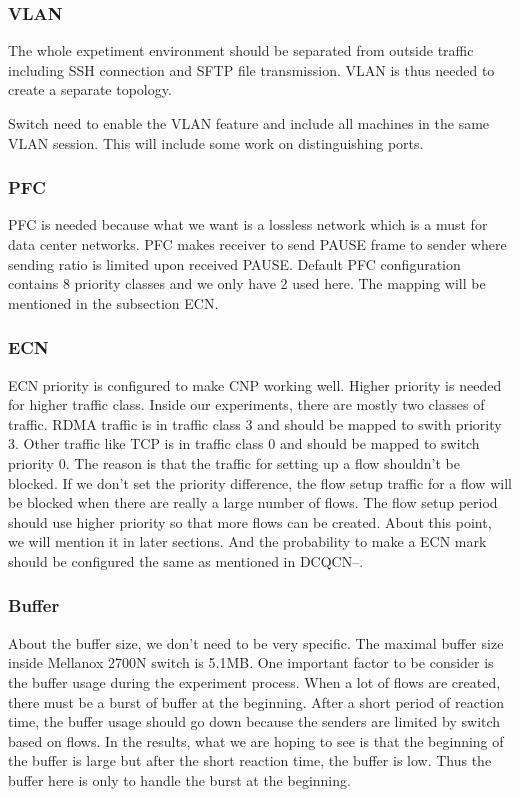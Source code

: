 \documentclass[12pt,a4paper]{article}
\begin{document}
\subsubsection{VLAN}
The whole expetiment environment should be separated from outside traffic including SSH connection and SFTP file transmission.
VLAN is thus needed to create a separate topology.

Switch need to enable the VLAN feature and include all machines in the same VLAN session.
This will include some work on distinguishing ports.

\subsubsection{PFC}
PFC is needed because what we want is a lossless network which is a must for data center networks.
PFC makes receiver to send PAUSE frame to sender where sending ratio is limited upon received PAUSE.
Default PFC configuration contains 8 priority classes and we only have 2 used here.
The mapping will be mentioned in the subsection ECN.

\subsubsection{ECN}
ECN priority is configured to make CNP working well. Higher priority is needed for higher traffic class.
Inside our experiments, there are mostly two classes of traffic. RDMA traffic is in traffic class 3 and should be mapped to swith priority 3.
Other traffic like TCP is in traffic class 0 and should be mapped to switch priority 0.
The reason is that the traffic for setting up a flow shouldn't be blocked. If we don't set the priority difference, the flow setup traffic for a flow
will be blocked when there are really a large number of flows. The flow setup period should use higher priority so that more flows can be created.
About this point, we will mention it in later sections.
And the probability to make a ECN mark should be configured the same as mentioned in DCQCN--.

\subsubsection{Buffer}
About the buffer size, we don't need to be very specific. The maximal buffer size inside Mellanox 2700N switch is 5.1MB.
One important factor to be consider is the buffer usage during the experiment process.
When a lot of flows are created, there must be a burst of buffer at the beginning.
After a short period of reaction time, the buffer usage should go down because the senders are limited by switch based on flows.
In the results, what we are hoping to see is that the beginning of the buffer is large but after the short reaction time, the buffer is low.
Thus the buffer here is only to handle the burst at the beginning.
\end{document}
